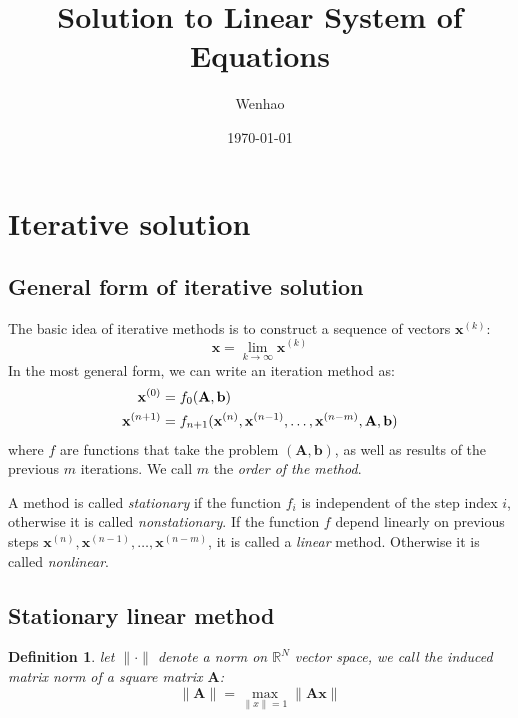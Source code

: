 \documentclass{article}
\newtheorem*{definition}{Definition}
\begin{document}
\title{Solution to Linear System of Equations}
\author{Wenhao}
\date{\today}
\maketitle

\section{Iterative solution}
\subsection{General form of iterative solution}
The basic idea of iterative methods is to construct a sequence of vectors 
$\mathbf{x}^{(k)}$:
\begin{equation*}
    \mathbf{x} = \lim_{k\to \infty} \mathbf{x}^{(k)}
\end{equation*}
In the most general form, we can write an iteration method as:
\begin{align}
    \mathbf{x}^{(0)} &= f_0(\mathbf{A}, \mathbf{b}) \notag \\
    \mathbf{x}^{(n+1)} &= f_{n+1}(\mathbf{x}^{(n)}, \mathbf{x}^{(n-1)}, \dots,  
    \mathbf{x}^{(n-m)}, \mathbf{A}, \mathbf{b})
\end{align}
where $f$ are functions that take the problem $(\mathbf{A}, \mathbf{b})$, as well as results of the previous 
$m$ iterations. We call $m$ the \emph{order of the method}. 

A method is called \emph{stationary} if the function $f_i$ is independent of the step index $i$, 
otherwise it is called \emph{nonstationary}. If the function $f$ depend linearly on previous steps 
$\mathbf{x}^{(n)}, \mathbf{x}^{(n-1)}, \dots,  \mathbf{x}^{(n-m)}$, it is called a 
\emph{linear} method. Otherwise it is called \emph{nonlinear}. 

\subsection{Stationary linear method}
\begin{definition}
let $\|\cdot\|$ denote a norm on $\mathbb{R}^N$ vector space,
we call the induced matrix 
norm of a square matrix $\mathbf{A}$:
\begin{equation*}
    \|\mathbf{A}\|=\max_{\|x\|=1} \|\mathbf{A}\mathbf{x}\|
\end{equation*}
\end{definition}
\end{document}
